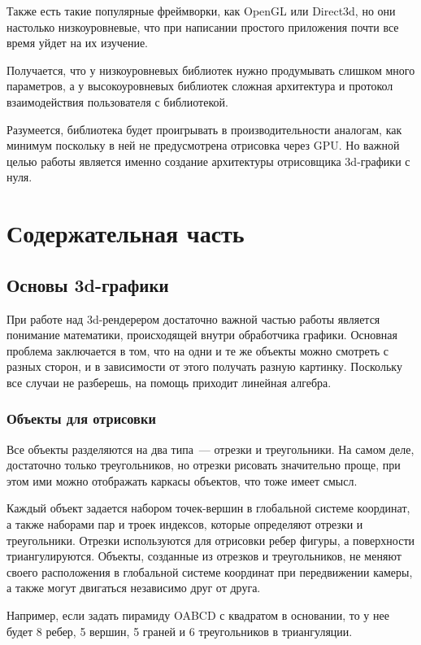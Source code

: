 \documentclass{article}
\begin{document}
Также есть такие популярные фреймворки, как OpenGL или Direct3d, но они настолько низкоуровневые, что при написании простого приложения почти все время уйдет на их изучение.

Получается, что у низкоуровневых библиотек нужно продумывать слишком много параметров, а у высокоуровневых библиотек сложная архитектура и протокол взаимодействия пользователя с библиотекой.

Разумеется, библиотека будет проигрывать в производительности аналогам, как минимум поскольку в ней не предусмотрена отрисовка через GPU. Но важной целью работы является именно создание архитектуры отрисовщика 3d-графики с нуля.

\newpage

\section{Содержательная часть}

\subsection{Основы 3d-графики}

При работе над 3d-рендерером достаточно важной частью работы является понимание математики, происходящей внутри обработчика графики. Основная проблема заключается в том, что на одни и те же объекты можно смотреть с разных сторон, и в зависимости от этого получать разную картинку. Поскольку все случаи не разберешь, на помощь приходит линейная алгебра.

\subsubsection{Объекты для отрисовки}

Все объекты разделяются на два типа~--- отрезки и треугольники. На самом деле, достаточно только треугольников, но отрезки рисовать значительно проще, при этом ими можно отображать каркасы объектов, что тоже имеет смысл.

Каждый объект задается набором точек-вершин в глобальной системе координат, а также наборами пар и троек индексов, которые определяют отрезки и треугольники. Отрезки используются для отрисовки ребер фигуры, а поверхности триангулируются. Объекты, созданные из отрезков и треугольников, не меняют своего расположения в глобальной системе координат при передвижении камеры, а также могут двигаться независимо друг от друга.

Например, если задать пирамиду OABCD с квадратом в основании, то у нее будет 8 ребер, 5 вершин, 5 граней и 6 треугольников в триангуляции.
\end{document}
